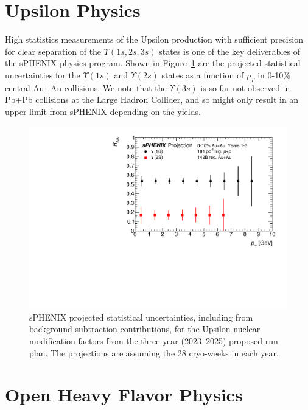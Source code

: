\section{Upsilon Physics}
\label{sec:upsilon}

High statistics measurements of the Upsilon production with sufficient precision for clear separation of the $\Upsilon(1s,2s,3s)$ states is one of the key deliverables of the sPHENIX physics program.  Shown in Figure~\ref{fig:upsilon3years} are the projected statistical uncertainties for the $\Upsilon(1s)$ and $\Upsilon(2s)$ states as a function of $p_{T}$ in 0-10\% central Au+Au collisions.   We note that the $\Upsilon(3s)$ is so far not observed in Pb+Pb collisions at the Large Hadron Collider, and so might only result in an upper limit from sPHENIX depending on the yields.   


\begin{figure}[h]
    \centering
    \includegraphics[width=0.55\linewidth]{figs/upsilon_RAA_1.pdf}
    \caption{sPHENIX projected statistical uncertainties, including from background subtraction contributions, for the Upsilon nuclear modification factors from the three-year (2023--2025) proposed run plan.   The projections are assuming the 28 cryo-weeks in each year.
    \label{fig:upsilon3years}}
\end{figure}

\section{Open Heavy Flavor Physics}
\label{sec:HF}

